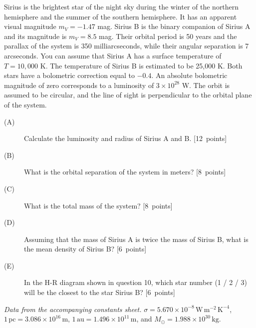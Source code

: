 Sirius is the brightest star of the night sky during the winter of the northern hemisphere and the summer
of the southern hemisphere. It has an apparent visual magnitude $m_V=-1.47$ mag. Sirius B is the binary
companion of Sirius A and its magnitude is $m_V=8.5$ mag. Their orbital period is 50 years and the parallax
of the system is 350 milliarcseconds, while their angular separation is 7 arcseconds.
You can assume that Sirius A has a surface temperature of $T=10{,}000$ K. The temperature of Sirius B is
estimated to be 25,000 K. Both stars have a bolometric correction equal to $-0.4$. An absolute bolometric
magnitude of zero corresponds to a luminosity of $3\times10^{28}$ W. The orbit is assumed to be circular,
and the line of sight is perpendicular to the orbital plane of the system.
\begin{description}
\item[(A)] Calculate the luminosity and radius of Sirius A and B. \hfill\mbox{[12 points]}
\item[(B)] What is the orbital separation of the system in meters? \hfill\mbox{[8 points]}
\item[(C)] What is the total mass of the system? \hfill\mbox{[8 points]}
\item[(D)] Assuming that the mass of Sirius A is twice the mass of Sirius B, what is the mean density of Sirius B? \hfill\mbox{[6 points]}
\item[(E)] In the H-R diagram shown in question 10, which star number (1 / 2 / 3) will be the closest to the star Sirius B? \hfill\mbox{[6 points]}
\end{description}
\textit{Data from the accompanying constants sheet.}
$\sigma=5.670\times10^{-8}\,\mathrm{W\,m^{-2}\,K^{-4}}$, $1\,\mathrm{pc}=3.086\times10^{16}\,\mathrm{m}$,
$1\,\mathrm{au}=1.496\times10^{11}\,\mathrm{m}$, and $M_\odot=1.988\times10^{30}\,\mathrm{kg}$.
